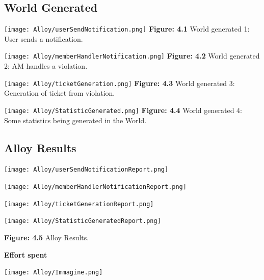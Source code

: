 \documentclass[12pt]{article}
\begin{document}
\subsection{World Generated}

\vspace{5mm}
\begin{center}

\texttt{[image: Alloy/userSendNotification.png]}   
\textbf{Figure: 4.1} World generated 1: User sends a notification.
\end{center}

\begin{center}

\texttt{[image: Alloy/memberHandlerNotification.png]}   
\textbf{Figure: 4.2} World generated 2: AM handles a violation.
\vspace{1.5cm}

\texttt{[image: Alloy/ticketGeneration.png]}   
\textbf{Figure: 4.3} World generated 3: Generation of ticket from violation.
\end{center}

\newpage

\begin{center}

\texttt{[image: Alloy/StatisticGenerated.png]}   
\textbf{Figure: 4.4} World generated 4: Some statistics being generated in the World.
\end{center}
\newpage
\subsection{Alloy Results}
\begin{center}

\texttt{[image: Alloy/userSendNotificationReport.png]}   
\vspace{3mm}

\texttt{[image: Alloy/memberHandlerNotificationReport.png]}   
\vspace{3mm}

\texttt{[image: Alloy/ticketGenerationReport.png]}   
\vspace{3mm}

\texttt{[image: Alloy/StatisticGeneratedReport.png]}   
\vspace{3mm}

\textbf{Figure: 4.5} Alloy Results.

\end{center}

\newpage


\textbf{\huge Effort spent}

\texttt{[image: Alloy/Immagine.png]}   
\vspace{3mm}
\end{document}
